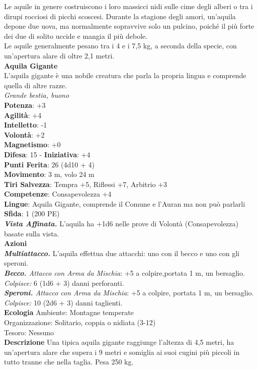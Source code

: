 \begin{multicols}{2}
Le aquile in genere costruiscono i loro massicci nidi sulle cime degli alberi o tra i dirupi rocciosi di picchi scoscesi. Durante la stagione degli amori, un’aquila depone due uova, ma normalmente sopravvive solo un pulcino, poiché il più forte dei due di solito uccide e mangia il più debole.\\

Le aquile generalmente pesano tra i 4 e i 7,5 kg, a seconda della specie, con un’apertura alare di oltre 2,1 metri.\\

\medskip\textbf{Aquila Gigante}\\
L'aquila gigante è una nobile creatura che parla la propria lingua e comprende quella di altre razze.\\
\emph{Grande bestia, buono}\\
\textbf{Potenza}: +3\\
\textbf{Agilità}: +4\\
\textbf{Intelletto}: -1\\
\textbf{Volontà}: +2\\
\textbf{Magnetismo}: +0\\
\textbf{Difesa}: 15 - \textbf{Iniziativa}: +4\\
\textbf{Punti Ferita}: 26 (4d10 + 4)\\
\textbf{Movimento}: 3 m, volo 24 m\\
\textbf{Tiri Salvezza}: Tempra +5, Riflessi +7, Arbitrio +3\\
\textbf{Competenze}: Consapevolezza +4\\
\textbf{Lingue}: Aquila Gigante, comprende il Comune e l'Auran ma non può parlarli\\
\textbf{Sfida}: 1 (200 PE)\smallskip\\
\emph{\textbf{Vista Affinata.}} L'aquila ha +1d6 nelle prove di Volontà (Consapevolezza) basate sulla vista.\\
\smallskip\textbf{Azioni}\\
\emph{\textbf{Multiattacco.}} L'aquila effettua due attacchi: uno con il becco e uno con gli speroni.\\
\emph{\textbf{Becco.} Attacco con Arma da Mischia}: +5 a colpire,portata 1 m, un bersaglio.\\
\emph{Colpisce:} 6 (1d6 + 3) danni perforanti.\\
\emph{\textbf{Speroni.} Attacco con Arma da Mischia}: +5 a colpire, portata 1 m, un bersaglio.\\
\emph{Colpisce:} 10 (2d6 + 3) danni taglienti.\\
\textbf{Ecologia}
Ambiente: Montagne temperate\\
Organizzazione: Solitario, coppia o nidiata (3-12)\\
Tesoro: Nessuno\\
\textbf{Descrizione}
Una tipica aquila gigante raggiunge l’altezza di 4,5 metri, ha un’apertura alare che supera i 9 metri e somiglia ai suoi cugini più piccoli in tutto tranne che nella taglia. Pesa 250 kg.\\


\end{multicols}
